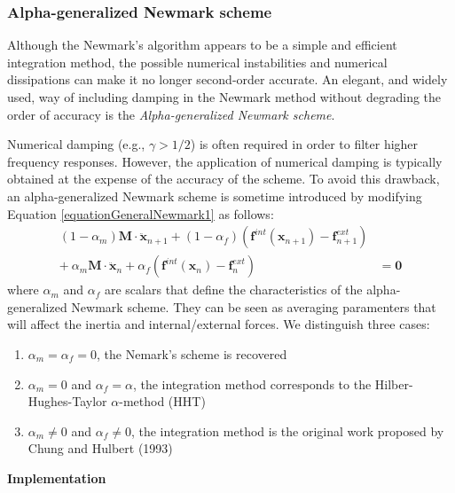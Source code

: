 \documentclass[oneside,11pt,times]{book}
\begin{document}
\subsubsection{Alpha-generalized Newmark scheme}\label{subsectionGeneralizedNewmark}
Although the Newmark's algorithm appears to be a simple and efficient integration method, the possible numerical instabilities and numerical dissipations can make it no longer second-order accurate. An elegant, and widely used, way of including damping in the Newmark method without degrading the order of accuracy is the \textit{Alpha-generalized Newmark scheme}.

Numerical damping (e.g., $\gamma > 1/2$) is often required in order to filter higher frequency responses. However, the application of numerical damping is typically obtained at the expense of the accuracy of the scheme. To avoid this drawback, an alpha-generalized Newmark scheme is sometime introduced by modifying Equation \eqref{equationGeneralNewmark1} as follows:
\begin{equation}%
 \begin{split}
 (1 - \alpha_m) \bm{M} \cdot \ddot{\bm{x}}_{n+1} + (1 - \alpha_f) \left(\bm{f}^{int}(\bm{x}_{n+1})- \bm{f}^{ext}_{n+1}\right) & \\ + \: \alpha_m \bm{M} \cdot \ddot{\bm{x}}_{n} + \alpha_f  \left(\bm{f}^{int}(\bm{x}_{n}) - \bm{f}^{ext}_{n}\right) & = \bm{0}
 \end{split}
\end{equation}
%
where $\alpha_m$ and $\alpha_f$ are scalars that define the characteristics of the alpha-generalized Newmark scheme. They can be seen as averaging paramenters that will affect the inertia and internal/external forces. We distinguish three cases:
\begin{enumerate}
\item $\alpha_m=\alpha_f=0$, the Nemark's scheme is recovered
\item $\alpha_m=0$ and $\alpha_f=\alpha$, the integration method corresponds to the Hilber-Hughes-Taylor $\alpha$-method (HHT)
\item $\alpha_m\neq 0$ and $\alpha_f\neq 0$, the integration method is the original work proposed by Chung and Hulbert (1993) \cite{belytschko:1998, geradin:1997}
\end{enumerate}

\textbf{Implementation}\\
\end{document}
